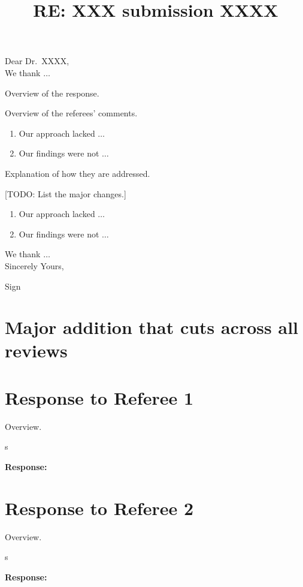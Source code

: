 \documentclass[12pt]{article}
\title{RE: XXX submission XXXX}
\date{}
\makeatletter
\newcommand{\todo}[1]{{\leavevmode\color{myorange}[TODO: #1]}}
\newcommand{\response}[1]{{\noindent \textbf{Response:} \\ \noindent #1}}
\newcommand{\rcomment}[1]{%
\vspace{10pt}
\begin{sectionbox}
s #1
\end{sectionbox}
}
\renewcommand{\maketitle}{\bgroup\setlength{\parindent}{0pt}
\begin{flushleft}
\Large  \textbf{\@title}
\end{flushleft}\egroup
}
\makeatother
\begin{document}
\maketitle

\bigskip
\noindent Dear Dr.~XXXX, \\

We thank $\dots$ 

Overview of the response.

Overview of the referees' comments.


\begin{enumerate}
    \itemsep0em
    \item Our approach lacked $\dots$ 
    \item Our findings were not $\dots$ 
\end{enumerate}

Explanation of how they are addressed. 

\todo{List the major changes.}

\begin{enumerate}
    \itemsep0em
    \item Our approach lacked $\dots$ 
    \item Our findings were not $\dots$ 
\end{enumerate}

We thank $\dots$ \\

Sincerely Yours,

Sign

\listoftodos


\clearpage
\tableofcontents
\clearpage


\section{Major addition that cuts across all reviews}\label{sec:major}

\lipsum[1]{} 


%
%
\clearpage
\section{Response to Referee 1}

Overview. 

\rcomment{%
\lipsum[1]{} 
}

\response{%
\lipsum[1]{}
}

%
%
\clearpage
\section{Response to Referee 2}

Overview. 

\rcomment{%
\lipsum[1]{} 
}

\response{%
\lipsum[1]{}
}

%
%
\clearpage
\printbibliography{}
\end{document}

